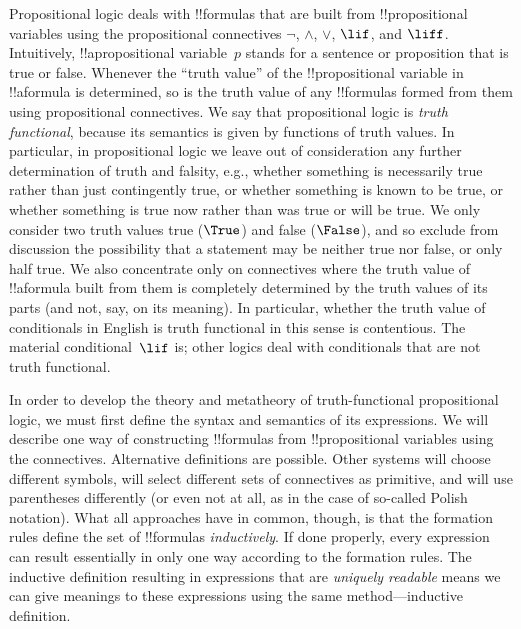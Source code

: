 \documentclass[../../../include/open-logic-section]{subfiles}
\begin{document}


Propositional logic deals with !!{formula}s that are built from
!!{propositional variable}s using the propositional connectives
$\lnot$, $\land$, $\lor$, $\lif$, and $\liff$.  Intuitively,
!!a{propositional variable}~$p$ stands for a sentence or proposition
that is true or false. Whenever the ``truth value'' of the
!!{propositional variable} in !!a{formula} is determined, so is the
truth value of any !!{formula}s formed from them using propositional
connectives.  We say that propositional logic is \emph{truth
  functional}, because its semantics is given by functions of truth
values. In particular, in propositional logic we leave out of
consideration any further determination of truth and falsity, e.g.,
whether something is necessarily true rather than just contingently
true, or whether something is known to be true, or whether something
is true now rather than was true or will be true.  We only consider
two truth values true ($\True$) and false ($\False$), and so exclude
from discussion the possibility that a statement may be neither true
nor false, or only half true. We also concentrate only on connectives where
the truth value of !!a{formula} built from them is completely
determined by the truth values of its parts (and not, say, on its
meaning). In particular, whether the truth value of conditionals in
English is truth functional in this sense is contentious. The material
conditional~$\lif$ is; other logics deal with conditionals that are
not truth functional.

In order to develop the theory and metatheory of truth-functional
propositional logic, we must first define the syntax and semantics of
its expressions.  We will describe one way of constructing
!!{formula}s from !!{propositional variable}s using the connectives.
Alternative definitions are possible. Other systems will choose
different symbols, will select different sets of connectives as
primitive, and will use parentheses differently (or even not at all,
as in the case of so-called Polish notation).  What all approaches
have in common, though, is that the formation rules define the set of
!!{formula}s \emph{inductively}. If done properly, every expression
can result essentially in only one way according to the formation
rules.  The inductive definition resulting in expressions that are
\emph{uniquely readable} means we can give meanings to these
expressions using the same method---inductive definition.
\end{document}
